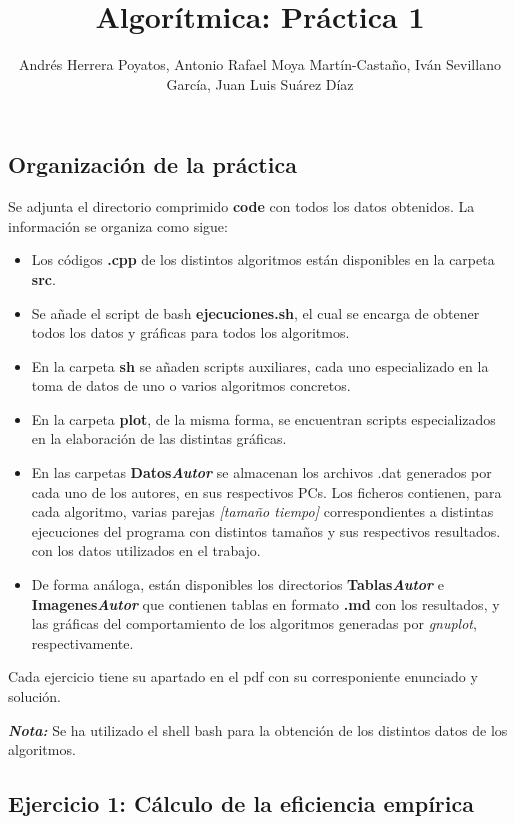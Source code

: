 \documentclass[]{article}
\title{Algorítmica: Práctica 1}
\author{Andrés Herrera Poyatos, Antonio Rafael Moya Martín-Castaño, Iván
Sevillano García, Juan Luis Suárez Díaz}
\date{}
\begin{document}
\maketitle


\subsection{Organización de la
práctica}\label{organizacion-de-la-practica}

Se adjunta el directorio comprimido \textbf{code} con todos los datos
obtenidos. La información se organiza como sigue:

\begin{itemize}
\itemsep1pt\parskip0pt
\item
  Los códigos \textbf{.cpp} de los distintos algoritmos están
  disponibles en la carpeta \textbf{src}.
\item
  Se añade el script de bash \textbf{ejecuciones.sh}, el cual se encarga
  de obtener todos los datos y gráficas para todos los algoritmos.
\item
  En la carpeta \textbf{sh} se añaden scripts auxiliares, cada uno
  especializado en la toma de datos de uno o varios algoritmos
  concretos.
\item
  En la carpeta \textbf{plot}, de la misma forma, se encuentran scripts
  especializados en la elaboración de las distintas gráficas.
\item
  En las carpetas \textbf{Datos\emph{Autor}} se almacenan los archivos
  .dat generados por cada uno de los autores, en sus respectivos PCs.
  Los ficheros contienen, para cada algoritmo, varias parejas
  \emph{{[}tamaño tiempo{]}} correspondientes a distintas ejecuciones
  del programa con distintos tamaños y sus respectivos resultados. con
  los datos utilizados en el trabajo.
\item
  De forma análoga, están disponibles los directorios
  \textbf{Tablas\emph{Autor}} e \textbf{Imagenes\emph{Autor}} que
  contienen tablas en formato \textbf{.md} con los resultados, y las
  gráficas del comportamiento de los algoritmos generadas por
  \emph{gnuplot}, respectivamente.
\end{itemize}

Cada ejercicio tiene su apartado en el pdf con su corresponiente
enunciado y solución.

\textbf{\emph{Nota:}} Se ha utilizado el shell bash para la obtención de
los distintos datos de los algoritmos.

\subsection{Ejercicio 1: Cálculo de la eficiencia
empírica}\label{ejercicio-1-calculo-de-la-eficiencia-empirica}
\end{document}
